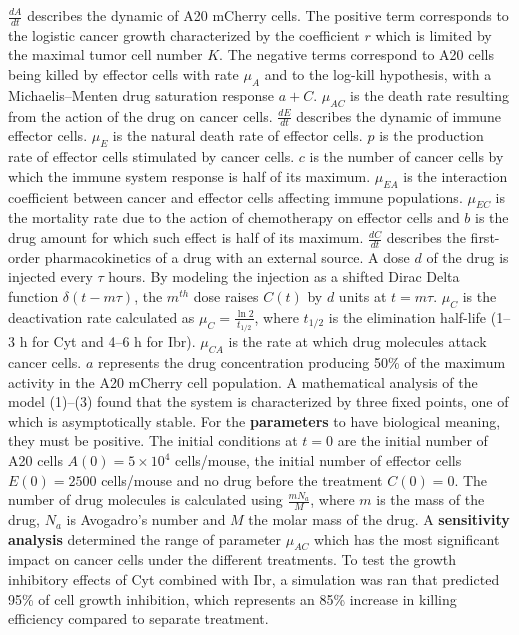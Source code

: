 $\frac{dA}{dt}$ describes the dynamic of A20 mCherry cells. The positive term corresponds to the logistic cancer growth characterized by the coefficient $r$ which is limited by the maximal tumor cell number $K$. 
The negative terms correspond to A20 cells being killed by effector cells with rate $\mu_A$ and to the log-kill hypothesis, with a Michaelis–Menten drug saturation response $a + C$. $\mu_{AC}$ is the death rate resulting from the action of the drug on cancer cells.
$\frac{dE}{dt}$ describes the dynamic of immune effector cells. $\mu_{E}$ is the natural death rate of effector cells. $p$ is the production rate of effector cells stimulated by cancer cells. $c$ is the number of cancer cells by which the immune system response is half of its maximum. 
$\mu_{EA}$ is the interaction coefficient between cancer and effector cells affecting immune populations. $\mu_{EC}$ is the mortality rate due to the action of chemotherapy on effector cells and $b$ is the drug amount for which such effect is half of its maximum.
$\frac{dC}{dt}$ describes the first-order pharmacokinetics of a drug with an external source. A dose $d$ of the drug is injected every $\tau$ hours. By modeling the injection as a shifted Dirac Delta function $\delta (t - m\tau)$, the $m^{th}$ dose raises $C(t)$ by $d$ units at $t=m\tau$. $\mu_C$ is the deactivation rate calculated as $\mu_C = \frac{\ln 2}{t_{1/2}}$, where $t_{1/2}$ is the elimination half-life (1–3 h for Cyt and 4–6 h for Ibr). $\mu_{CA}$ is the rate at which drug molecules attack cancer cells. 
$a$ represents the drug concentration producing 50\% of the maximum activity in the A20 mCherry cell population. A mathematical analysis of the model (1)–(3) found that the system is characterized by three fixed points, one of which is asymptotically stable.
For the \textbf{parameters} to have biological meaning, they must be positive. The initial conditions at $t=0$ are the initial number of A20 cells $A(0) = 5 \times 10^4$ cells/mouse, the initial number of effector cells $E(0) = 2500$ cells/mouse and no drug before the treatment $C(0)=0$. The number of drug molecules is calculated using $\frac{mN_a}{M}$, where $m$ is the mass of the drug, $N_a$ is Avogadro's number and $M$ the molar mass of the drug.
A \textbf{sensitivity analysis} determined the range of parameter $\mu_{AC}$ which has the most significant impact on cancer cells under the different treatments. To test the growth inhibitory effects of Cyt combined with Ibr, a simulation was ran that predicted 95\% of cell growth inhibition, which represents an 85\% increase in killing efficiency compared to separate treatment.
